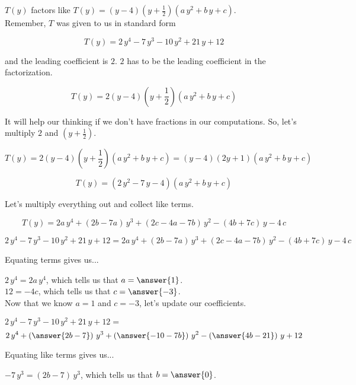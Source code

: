 \documentclass{ximera}
\begin{document}
\begin{explanation}



$T(y)$ factors like $T(y) = (y-4) \left(y+\frac{1}{2}\right) (a \, y^2 + b \, y + c)$. \\


Remember, $T$ was given to us in standard form

\[   T(y) = 2\, y^4 - 7 \, y^3 - 10 \, y^2 + 21 \, y + 12   \]


and the leading coefficient is $2$.  $2$ has to be the leading coefficient in the factorization.

\[   T(y) = 2 (y-4) \left(y+\frac{1}{2}\right) (a \, y^2 + b \, y + c)   \]



 It will help our thinking if we don't have fractions in our computations. So, let's multiply $2$ and $\left(y+\frac{1}{2}\right)$.



\[
T(y) = 2 (y-4) \left(y+\frac{1}{2}\right) (a \, y^2 + b \, y + c) = (y-4) (2y+1) (a \, y^2 + b \, y + c)
\]


\[
T(y) = (2 \, y^2 - 7 \, y - 4) (a \, y^2 + b \, y + c)
\]


Let's multiply everything out and collect like terms.


\[
T(y) = 2 a \, y^4 + (2 b - 7 a) \, y^3 + (2c - 4 a - 7 b) \, y^2 - (4 b + 7 c) \, y - 4 \, c
\]


\[
2\, y^4 - 7 \, y^3 - 10 \, y^2 + 21 \, y + 12 = 2 a \, y^4 + (2 b - 7 a) \, y^3 + (2 c - 4 a - 7 b) \, y^2 - (4 b + 7 c) \, y - 4 \, c
\]


Equating terms gives us...


$2 \, y^4 = 2 a \, y^4$, which tells us that $a = \answer{1}$. \\

$12 = -4 c$, which tells us that $c =  \answer{-3}$. \\



Now that we know $a = 1$ and $c = -3$, let's update our coefficients.


$2\, y^4 - 7 \, y^3 - 10 \, y^2 + 21 \, y + 12 =$
\[
2 \, y^4 + \left( \answer{2 b - 7 } \right) \, y^3 + \left( \answer{-10 - 7 b} \right) \, y^2 - \left( \answer{4 b - 21} \right) \, y + 12
\]




Equating like terms gives us...


$-7 \, y^3 = (2 b - 7) \, y^3$, which tells us that $b = \answer{0}$. \\




\end{explanation}
\end{document}
